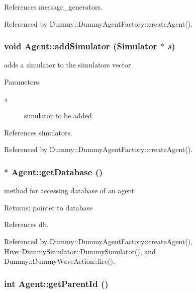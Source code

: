 References message\_\-generators.

Referenced by Dummy::DummyAgentFactory::createAgent().
\subsubsection[addSimulator]{\setlength{\rightskip}{0pt plus 5cm}void Agent::addSimulator ({\bf Simulator} $\ast$ {\em s})}\label{classHive_1_1Agent_5c0b83894065bd48801026269297c7d4}


adds a simulator to the simulators vector \begin{Desc}
\item[Parameters:]
\begin{description}
\item[{\em s}]simulator to be added \end{description}
\end{Desc}


References simulators.

Referenced by Dummy::DummyAgentFactory::createAgent().
\subsubsection[getDatabase]{ $\ast$ Agent::getDatabase ()}\label{classHive_1_1Agent_a2e9e670185a1cc43c392dd3d3450bca}


method for accessing database of an agent \begin{Desc}
\item[Returns:]pointer to database \end{Desc}


References db.

Referenced by Dummy::DummyAgentFactory::createAgent(), Hive::DummySimulator::DummySimulator(), and Dummy::DummyWaveAction::fire().
\subsubsection[getParentId]{\setlength{\rightskip}{0pt plus 5cm}int Agent::getParentId ()}\label{classHive_1_1Agent_bf305ea102ca79f0619e4ee30b856868}


